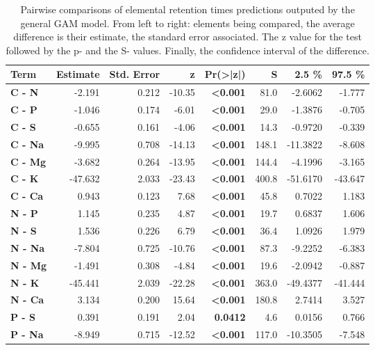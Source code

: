 \begin{table}[H]
\centering
\caption{\label{tab:table_pairs_i_rt}Pairwise comparisons of elemental retention times predictions outputed by the general GAM model. From left to right: elements being compared, the average difference is their estimate, the standard error associated. The z value for the test followed by the p- and the S- values. Finally, the confidence interval of the difference.}
\centering
\begin{tabular}[t]{>{}lrrr>{}rrrr}
\toprule
\textbf{Term} & \textbf{Estimate} & \textbf{Std. Error} & \textbf{z} & \textbf{Pr(>|z|)} & \textbf{S} & \textbf{2.5 \%} & \textbf{97.5 \%}\\
\midrule
\textbf{C - N} & -2.191 & 0.212 & -10.35 & \textbf{<0.001} & 81.0 & -2.6062 & -1.777\\
\textbf{C - P} & -1.046 & 0.174 & -6.01 & \textbf{<0.001} & 29.0 & -1.3876 & -0.705\\
\textbf{C - S} & -0.655 & 0.161 & -4.06 & \textbf{<0.001} & 14.3 & -0.9720 & -0.339\\
\textbf{C - Na} & -9.995 & 0.708 & -14.13 & \textbf{<0.001} & 148.1 & -11.3822 & -8.608\\
\textbf{C - Mg} & -3.682 & 0.264 & -13.95 & \textbf{<0.001} & 144.4 & -4.1996 & -3.165\\
\textbf{C - K} & -47.632 & 2.033 & -23.43 & \textbf{<0.001} & 400.8 & -51.6170 & -43.647\\
\textbf{C - Ca} & 0.943 & 0.123 & 7.68 & \textbf{<0.001} & 45.8 & 0.7022 & 1.183\\
\textbf{N - P} & 1.145 & 0.235 & 4.87 & \textbf{<0.001} & 19.7 & 0.6837 & 1.606\\
\textbf{N - S} & 1.536 & 0.226 & 6.79 & \textbf{<0.001} & 36.4 & 1.0926 & 1.979\\
\textbf{N - Na} & -7.804 & 0.725 & -10.76 & \textbf{<0.001} & 87.3 & -9.2252 & -6.383\\
\textbf{N - Mg} & -1.491 & 0.308 & -4.84 & \textbf{<0.001} & 19.6 & -2.0942 & -0.887\\
\textbf{N - K} & -45.441 & 2.039 & -22.28 & \textbf{<0.001} & 363.0 & -49.4377 & -41.444\\
\textbf{N - Ca} & 3.134 & 0.200 & 15.64 & \textbf{<0.001} & 180.8 & 2.7414 & 3.527\\
\textbf{P - S} & 0.391 & 0.191 & 2.04 & \textbf{0.0412} & 4.6 & 0.0156 & 0.766\\
\textbf{P - Na} & -8.949 & 0.715 & -12.52 & \textbf{<0.001} & 117.0 & -10.3505 & -7.548\\

\end{tabular}
\end{table}
